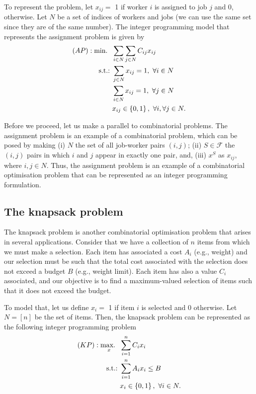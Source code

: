 To represent the problem, let $x_{ij} =$ 1 if worker $i$ is assigned to job $j$ and 0, otherwise. Let $N$ be a set of indices of workers and jobs (we can use the same set since they are of the same number). The integer programming model that represents the assignment problem is given by
%  
\begin{align*} 
  (AP) : \mathop{\text{min.~}} \ & \sum_{i \in N}\sum_{j \in N} C_{ij}x_{ij} \\
  \mathop{\text{s.t.:~}} & \sum_{j \in N} x_{ij} = 1, \ \forall i \in N\\
      & \sum_{i \in N} x_{ij} = 1, \ \forall j \in N\\
      & x_{ij} \in \left\{ 0,1 \right \},  \ \forall i, \forall j \in N.
\end{align*}
%

Before we proceed, let us make a parallel to combinatorial problems. The assignment problem is an example of a combinatorial problem, which can be posed by making (i) $N$ the set of all job-worker pairs $(i,j)$; (ii) $S \in \mathcal{F}$ the $(i,j)$ pairs in which $i$ and $j$ appear in exactly one pair, and, (iii) $x^S$ as $x_{ij}$, where $i,j \in N$. Thus, the assignment problem is an example of a combinatorial optimisation problem that can be represented as an integer programming formulation.


\subsection{The knapsack problem}

The knapsack problem is another combinatorial optimisation problem that arises in several applications. Consider that we have a collection of $n$ items from which we must make a selection. Each item has associated a cost $A_i$ (e.g., weight) and our selection must be such that the total cost associated with the selection does not exceed a budget $B$ (e.g., weight limit). Each item has also a value $C_i$ associated, and our objective is to find a maximum-valued selection of items such that it does not exceed the budget. 

To model that, let us define $x_{i} =$ 1 if item $i$ is selected and 0 otherwise. Let $N = [n]$ be the set of items. Then, the knapsack problem can be represented as the following integer programming problem     
%  
\begin{align*}
	(KP) : \mathop{\text{max.~}}_x \ & \sum_{i=1}^nC_{i}x_{i} \\
	\mathop{\text{s.t.:~}} & \sum_{i = 1}^n A_{i}x_{i} \leq B\\
	  & x_{i} \in \left\{ 0,1 \right \}, \ \forall i \in N. 
\end{align*}

